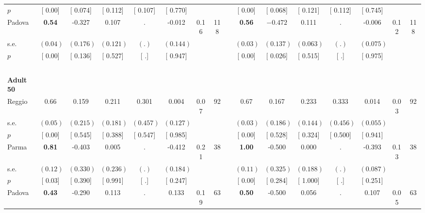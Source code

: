 \begin{longtable}{L{8em} c c c c c c c p{1em} c c c c c c c}
\quad \quad \quad \quad $ p$ & [     0.00] & [    0.074] & [    0.112] & [    0.107] & [    0.770] & & & & [     0.00] & [    0.068] & [    0.121] & [    0.112] & [    0.745] & &  \\[1em]
\quad \quad \quad Padova& \textbf{     0.54} &    -0.327 &     0.107 &         . &    -0.012 &      0.16 &       118 & & \textbf{     0.56} & $ \mathbf{   -0.472}$ &     0.111 &         . &    -0.006 &      0.12 &       118  \\*
\quad \quad \quad \quad s.e.& $ (     0.04)$ & $ (    0.176)$ & $ (    0.121)$ & $ (        .)$ & $ (    0.144)$ & & & & $ (     0.03)$ & $ (    0.137)$ & $ (    0.063)$ & $ (        .)$ & $ (    0.075)$ & &  \\*
\quad \quad \quad \quad $ p$ & [     0.00] & [    0.136] & [    0.527] & [        .] & [    0.947] & & & & [     0.00] & [    0.026] & [    0.515] & [        .] & [    0.975] & &  \\[1em]
~\\[1em]
\quad \quad \textbf{Adult 50} & & & & & & & & & & & & & & & \\* 
\quad \quad \quad Reggio& 0.66 &     0.159 &     0.211 &     0.301 &     0.004 &      0.07 &        92 & & 0.67 &     0.167 &     0.233 &     0.333 &     0.014 &      0.03 &        92  \\*
\quad \quad \quad \quad s.e.& $ (     0.05)$ & $ (    0.215)$ & $ (    0.181)$ & $ (    0.457)$ & $ (    0.127)$ & & & & $ (     0.03)$ & $ (    0.186)$ & $ (    0.144)$ & $ (    0.456)$ & $ (    0.055)$ & &  \\*
\quad \quad \quad \quad $ p$ & [     0.00] & [    0.545] & [    0.388] & [    0.547] & [    0.985] & & & & [     0.00] & [    0.528] & [    0.324] & [    0.500] & [    0.941] & &  \\[1em]
\quad \quad \quad Parma& \textbf{     0.81} &    -0.403 &     0.005 &         . &    -0.412 &      0.21 &        38 & & \textbf{     1.00} &    -0.500 &     0.000 &         . &    -0.393 &      0.13 &        38  \\*
\quad \quad \quad \quad s.e.& $ (     0.12)$ & $ (    0.330)$ & $ (    0.236)$ & $ (        .)$ & $ (    0.184)$ & & & & $ (     0.11)$ & $ (    0.325)$ & $ (    0.188)$ & $ (        .)$ & $ (    0.087)$ & &  \\*
\quad \quad \quad \quad $ p$ & [     0.03] & [    0.390] & [    0.991] & [        .] & [    0.247] & & & & [     0.00] & [    0.284] & [    1.000] & [        .] & [    0.251] & &  \\[1em]
\quad \quad \quad Padova& \textbf{     0.43} &    -0.290 &     0.113 &         . &     0.133 &      0.19 &        63 & & \textbf{     0.50} &    -0.500 &     0.056 &         . &     0.107 &      0.05 &        63  \\*

\end{longtable}
